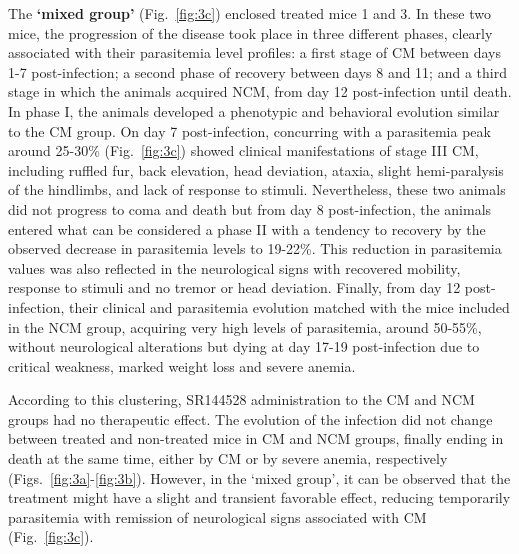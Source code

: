 \documentclass[empirical, authordate]{jote-new-article}
\begin{document}
The \textbf{`mixed group' }(Fig.~\ref{fig:3c}) enclosed treated mice 1 and 3. In these two mice, the progression of the disease took place in three different phases, clearly associated with their parasitemia level profiles: a first stage of CM between days 1-7 post-infection; a second phase of recovery between days 8 and 11; and a third stage in which the animals acquired NCM, from day 12 post-infection until death. In phase I, the animals developed a phenotypic and behavioral evolution similar to the CM group. On day 7 post-infection, concurring with a parasitemia peak around 25-30\% (Fig.~\ref{fig:3c}) showed clinical manifestations of stage III CM, including ruffled fur, back elevation, head deviation, ataxia, slight hemi-paralysis of the hindlimbs, and lack of response to stimuli. Nevertheless, these two animals did not progress to coma and death but from day 8 post-infection, the animals entered what can be considered a phase II with a tendency to recovery by the observed decrease in parasitemia levels to 19-22\%. This reduction in parasitemia values was also reflected in the neurological signs with recovered mobility, response to stimuli and no tremor or head deviation. Finally, from day 12 post-infection, their clinical and parasitemia evolution matched with the mice included in the NCM group, acquiring very high levels of parasitemia, around 50-55\%, without neurological alterations but dying at day 17-19 post-infection due to critical weakness, marked weight loss and severe anemia.


According to this clustering, SR144528 administration to the CM and NCM groups had no therapeutic effect. The evolution of the infection did not change between treated and non-treated mice in CM and NCM groups, finally ending in death at the same time, either by CM or by severe anemia, respectively (Figs.~\ref{fig:3a}-\ref{fig:3b}). However, in the `mixed group', it can be observed that the treatment might have a slight and transient favorable effect, reducing temporarily parasitemia with remission of neurological signs associated with CM (Fig.~\ref{fig:3c}).
\end{document}

